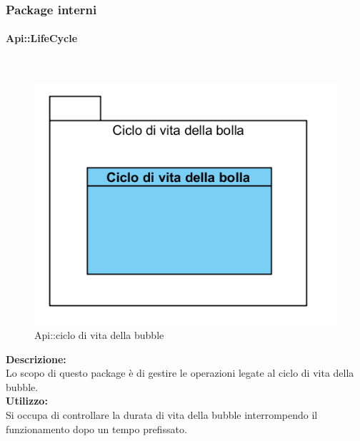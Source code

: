 \subsubsection{Package interni}

\begin{samepage}
\paragraph{Api\-::Life\-Cycle}\label{api-ciclovita}\mbox{}\\
\begin{figure}[H]
	\centering
	\includegraphics[width=14cm]{diagrammi_img/classi_e_package/api_vitabolla.png}
	\caption{Api\-::ciclo di vita della bubble}
\end{figure}
\end{samepage}
\textbf{Descrizione:}\\ 
Lo scopo di questo package è di gestire le operazioni legate al ciclo di vita della bubble.\\
\textbf{Utilizzo:}\\
Si occupa di controllare la durata di vita della bubble interrompendo il funzionamento dopo un tempo prefissato.\\

